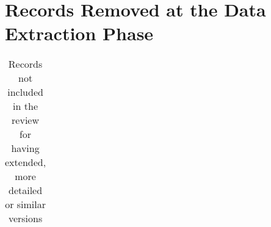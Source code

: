 \onecolumn

\section{Records Removed at the Data Extraction Phase}
\label{a1:rmv-records}

\begin{table*}[!h]
  \renewcommand{\arraystretch}{1.25}
  \setlength{\tabcolsep}{3pt}
  \caption[Records not included in the review for having extended, more detailed or similar versions]{Records not included in the review for having extended, more detailed or similar versions}
  \vspace{0.5em}
  \label{tab:a1:rmv-records}
  \centering
  {\scriptsize
  \begin{tabular}{l l}


\end{tabular}}
\end{table*}
